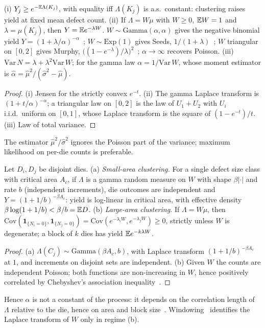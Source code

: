 \documentclass[10pt,twocolumn]{article}
\newcommand{\one}{\mathbf 1}
\begin{document}
\begin{proposition}[mixtures]\label{prop:mix}
(i) $Y_j\ge e^{-\mathbb{E}\Lambda(K_j)}$, with equality iff $\Lambda(K_j)$ is a.s.\ constant: clustering raises yield at fixed mean defect count. (ii) If $\Lambda=W\mu$ with $W\ge0$, $\mathbb{E} W=1$ and $\lambda=\mu(K_j)$, then $Y=\mathbb{E} e^{-\lambda W}$. $W\sim\mathrm{Gamma}(\alpha,\alpha)$ gives the negative binomial yield $Y=(1+\lambda/\alpha)^{-\alpha}$~\cite{stapper1983}; $W\sim\mathrm{Exp}(1)$ gives Seeds, $1/(1+\lambda)$~\cite{seeds1967}; $W$ triangular on $[0,2]$ gives Murphy, $\big((1-e^{-\lambda})/\lambda\big)^2$~\cite{murphy1964}; $\alpha\to\infty$ recovers Poisson. (iii) $\mathrm{Var}\,N=\lambda+\lambda^2\mathrm{Var}\,W$; for the gamma law $\alpha=1/\mathrm{Var}\,W$, whose moment estimator is $\hat\alpha=\hat\mu^2/(\hat\sigma^2-\hat\mu)$.
\end{proposition}
\begin{proof}
(i) Jensen for the strictly convex $e^{-t}$. (ii) The gamma Laplace transform is $(1+t/\alpha)^{-\alpha}$; a triangular law on $[0,2]$ is the law of $U_1+U_2$ with $U_i$ i.i.d.\ uniform on $[0,1]$, whose Laplace transform is the square of $(1-e^{-t})/t$. (iii) Law of total variance.
\end{proof}
The estimator $\hat\mu^2/\hat\sigma^2$ ignores the Poisson part of the variance; maximum likelihood on per-die counts is preferable.

\begin{proposition}\label{prop:scale}
Let $D_i,D_j$ be disjoint dies. (a) \emph{Small-area clustering.} For a single defect size class with critical area $A_c$, if $\Lambda$ is a gamma random measure on $W$ with shape $\beta|\cdot|$ and rate $b$ (independent increments), die outcomes are independent and $Y=(1+1/b)^{-\beta A_c}$: yield is log-linear in critical area, with effective density $\beta\log(1+1/b)<\beta/b=\mathbb{E} D$. (b) \emph{Large-area clustering.} If $\Lambda=W\mu$, then $\mathrm{Cov}(\one_{\{N_i=0\}},\one_{\{N_j=0\}})=\mathrm{Cov}(e^{-\lambda_iW},e^{-\lambda_jW})\ge0$, strictly unless $W$ is degenerate; a block of $k$ dies has yield $\mathbb{E} e^{-k\lambda W}$.
\end{proposition}
\begin{proof}
(a) $\Lambda(C_j)\sim\mathrm{Gamma}(\beta A_c,b)$, with Laplace transform $(1+1/b)^{-\beta A_c}$ at $1$, and increments on disjoint sets are independent. (b) Given $W$ the counts are independent Poisson; both functions are non-increasing in $W$, hence positively correlated by Chebyshev's association inequality~\cite{esary1967}.
\end{proof}
Hence $\alpha$ is not a constant of the process: it depends on the correlation length of $\Lambda$ relative to the die, hence on area and block size~\cite{stapper1989,koren1993}. Windowing~\cite{leachman2014} identifies the Laplace transform of $W$ only in regime (b).
\end{document}
